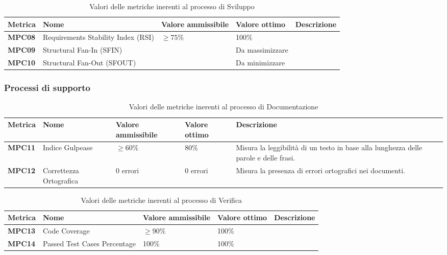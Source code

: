 \documentclass[italian,12pt]{article} %
\begin{document}
\newpage
{}

\begin{table}[h!]
	\centering
	\begin{tabularx}{\textwidth}{|X|X|X|X|X|} 	 
		\hline
		\textbf{Metrica} 	& \textbf{Nome} & \textbf{Valore ammissibile} & \textbf{Valore ottimo} & \textbf{Descrizione}\\  	 
		\hline
		\textbf{MPC08} 		& Requirements Stability Index (RSI) 	& $\geq 75\% $ 			& 100\% & \\
		\hline
		\textbf{MPC09} 		& Structural Fan-In (SFIN) 				&  						& Da massimizzare & \\ 
		\hline
		\textbf{MPC10} 		& Structural Fan-Out (SFOUT) 			&  						& Da minimizzare & \\ 
		\hline
	\end{tabularx}
	\caption{ Valori delle metriche inerenti al processo di Sviluppo}
	\label{table:2}
\end{table}

\subsubsection{Processi di supporto}


\begin{table}[h!]
	\centering
	\begin{tabularx}{\textwidth}{|X|X|X|X|X|} 	 
		\hline
		\textbf{Metrica} 	& \textbf{Nome} & \textbf{Valore ammissibile} & \textbf{Valore ottimo}& \textbf{Descrizione}\\  	 
		\hline
		\textbf{MPC11} & Indice Gulpease & $\geq 60\% $ & 80\% & Misura la leggibilità di un testo in base alla lunghezza delle parole e delle frasi.\\
		\hline
		\textbf{MPC12} & Correttezza Ortografica & 0 errori & 0 errori &Misura la presenza di errori ortografici nei documenti.\\ 
		\hline
	\end{tabularx}
	\caption{ Valori delle metriche inerenti al processo di Documentazione}
	\label{table:3}
\end{table}

\begin{table}[h!]
	\centering
	\begin{tabularx}{\textwidth}{|X|X|X|X|X|} 	 
		\hline
		\textbf{Metrica} 	& \textbf{Nome} & \textbf{Valore ammissibile} & \textbf{Valore ottimo}& \textbf{Descrizione}\\  	 
		\hline
		\textbf{MPC13} & Code Coverage & $\geq 90\% $ & 100\% &\\
		\hline
		\textbf{MPC14} & Passed Test Cases Percentage & 100\% & 100\% &\\ 
		\hline
	\end{tabularx}
	\caption{ Valori delle metriche inerenti al processo di Verifica}
	\label{table:4}
\end{table}
\end{document}
